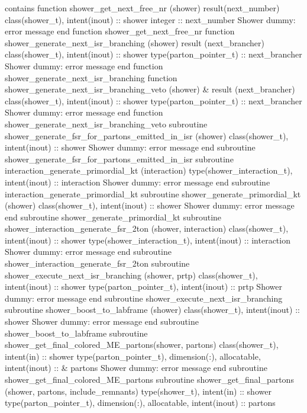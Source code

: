 contains
    function shower_get_next_free_nr (shower) result(next_number)
      class(shower_t), intent(inout) :: shower
      integer :: next_number
      \LA{}Shower dummy: error message\RA{}
    end function shower_get_next_free_nr
    function shower_generate_next_isr_branching (shower) result (next_brancher)
      class(shower_t), intent(inout) :: shower
      type(parton_pointer_t) :: next_brancher
      \LA{}Shower dummy: error message\RA{}
    end function shower_generate_next_isr_branching
    function shower_generate_next_isr_branching_veto (shower) &
         result (next_brancher)
      class(shower_t), intent(inout) :: shower
      type(parton_pointer_t) :: next_brancher
      \LA{}Shower dummy: error message\RA{}
    end function shower_generate_next_isr_branching_veto
    subroutine shower_generate_fsr_for_partons_emitted_in_isr (shower)
      class(shower_t), intent(inout) :: shower
      \LA{}Shower dummy: error message\RA{}
    end subroutine shower_generate_fsr_for_partons_emitted_in_isr
    subroutine interaction_generate_primordial_kt (interaction)
      type(shower_interaction_t), intent(inout) :: interaction
      \LA{}Shower dummy: error message\RA{}
    end subroutine interaction_generate_primordial_kt
    subroutine shower_generate_primordial_kt (shower)
      class(shower_t), intent(inout) :: shower
      \LA{}Shower dummy: error message\RA{}
    end subroutine shower_generate_primordial_kt
    subroutine shower_interaction_generate_fsr_2ton (shower, interaction)
      class(shower_t), intent(inout) :: shower
      type(shower_interaction_t), intent(inout) :: interaction
      \LA{}Shower dummy: error message\RA{}
    end subroutine shower_interaction_generate_fsr_2ton
    subroutine shower_execute_next_isr_branching (shower, prtp)
      class(shower_t), intent(inout) :: shower
      type(parton_pointer_t), intent(inout) :: prtp
      \LA{}Shower dummy: error message\RA{}
    end subroutine shower_execute_next_isr_branching
    subroutine shower_boost_to_labframe (shower)
      class(shower_t), intent(inout) :: shower
      \LA{}Shower dummy: error message\RA{}
    end subroutine shower_boost_to_labframe
    subroutine shower_get_final_colored_ME_partons(shower, partons)
      class(shower_t), intent(in) :: shower
      type(parton_pointer_t), dimension(:), allocatable, intent(inout) :: &
           partons
      \LA{}Shower dummy: error message\RA{}
    end subroutine shower_get_final_colored_ME_partons
    subroutine shower_get_final_partons (shower, partons, include_remnants)
      type(shower_t), intent(in) :: shower
      type(parton_pointer_t), dimension(:), allocatable, intent(inout) :: partons
